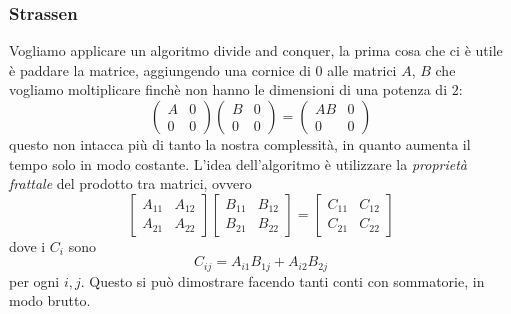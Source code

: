 \documentclass[11pt]{scrartcl}
\begin{document}
	\subsubsection{Strassen}
	
	Vogliamo applicare un algoritmo divide and conquer, la prima cosa che ci è utile è paddare la matrice, aggiungendo una cornice di $0$ alle matrici $A$, $B$ che vogliamo moltiplicare finchè non hanno le dimensioni di una potenza di $2$:
	$$
	\left(
	\begin{array}{c|c}
		A & 0 \\
		\hline 
		0 & 0
	\end{array}
	\right)
	\left(
	\begin{array}{c|c}
		B & 0 \\
		\hline
		0 & 0
	\end{array}
	\right)=
	\left(
	\begin{array}{c|c}
		AB & 0 \\
		\hline
		0 & 0
	\end{array}
	\right)
	$$
	questo non intacca più di tanto la nostra complessità, in quanto aumenta il tempo solo in modo costante. L'idea dell'algoritmo è utilizzare la \textit{proprietà frattale} del prodotto tra matrici, ovvero
	$$
	\left[
	\begin{array}{c|c}
		A_{11} & A_{12} \\
		\hline
		A_{21} & A_{22}
	\end{array}
	\right]
	\left[
	\begin{array}{c|c}
		B_{11} & B_{12} \\
		\hline
		B_{21} & B_{22}
	\end{array}
	\right]=
	\left[
	\begin{array}{c|c}
		C_{11} & C_{12} \\
		\hline
		C_{21} & C_{22}
	\end{array}
	\right]
	$$
	dove i $C_i$ sono
	$$C_{ij}=A_{i1}B_{1j}+A_{i2}B_{2j}$$
	per ogni $i,j$. Questo si può dimostrare facendo tanti conti con sommatorie, in modo brutto. 
	
\end{document}
